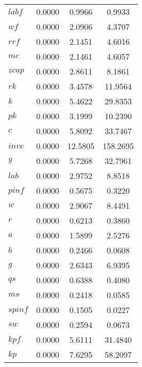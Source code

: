 \begin{center}
\begin{longtable}{lccc}
$labf      $	 & 	       0.0000	 & 	       0.9966	 & 	       0.9933 \\ 
$wf        $	 & 	       0.0000	 & 	       2.0906	 & 	       4.3707 \\ 
$rrf       $	 & 	       0.0000	 & 	       2.1451	 & 	       4.6016 \\ 
$mc        $	 & 	       0.0000	 & 	       2.1461	 & 	       4.6057 \\ 
$zcap      $	 & 	       0.0000	 & 	       2.8611	 & 	       8.1861 \\ 
$rk        $	 & 	       0.0000	 & 	       3.4578	 & 	      11.9564 \\ 
$k         $	 & 	       0.0000	 & 	       5.4622	 & 	      29.8353 \\ 
$pk        $	 & 	       0.0000	 & 	       3.1999	 & 	      10.2390 \\ 
$c         $	 & 	       0.0000	 & 	       5.8092	 & 	      33.7467 \\ 
$inve      $	 & 	       0.0000	 & 	      12.5805	 & 	     158.2695 \\ 
$y         $	 & 	       0.0000	 & 	       5.7268	 & 	      32.7961 \\ 
$lab       $	 & 	       0.0000	 & 	       2.9752	 & 	       8.8518 \\ 
$pinf      $	 & 	       0.0000	 & 	       0.5675	 & 	       0.3220 \\ 
$w         $	 & 	       0.0000	 & 	       2.9067	 & 	       8.4491 \\ 
$r         $	 & 	       0.0000	 & 	       0.6213	 & 	       0.3860 \\ 
$a         $	 & 	       0.0000	 & 	       1.5899	 & 	       2.5276 \\ 
$b         $	 & 	       0.0000	 & 	       0.2466	 & 	       0.0608 \\ 
$g         $	 & 	       0.0000	 & 	       2.6343	 & 	       6.9395 \\ 
$qs        $	 & 	       0.0000	 & 	       0.6388	 & 	       0.4080 \\ 
$ms        $	 & 	       0.0000	 & 	       0.2418	 & 	       0.0585 \\ 
$spinf     $	 & 	       0.0000	 & 	       0.1505	 & 	       0.0227 \\ 
$sw        $	 & 	       0.0000	 & 	       0.2594	 & 	       0.0673 \\ 
$kpf       $	 & 	       0.0000	 & 	       5.6111	 & 	      31.4840 \\ 
$kp        $	 & 	       0.0000	 & 	       7.6295	 & 	      58.2097 \\ 
\end{longtable}
 \end{center}
